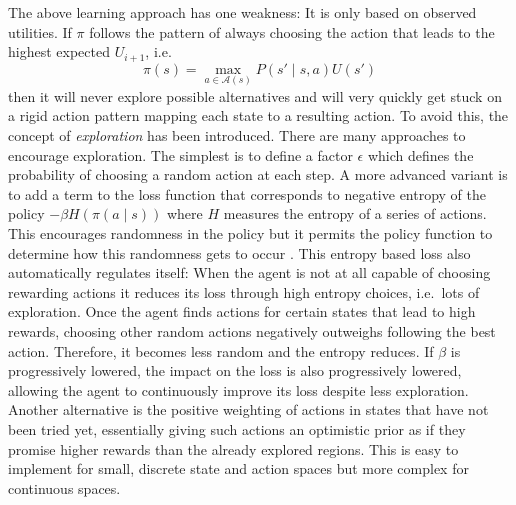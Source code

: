 The above learning approach has one weakness: It is only based on observed utilities. If $\pi$ follows the pattern of
always choosing the action that leads to the highest expected $U_{i+1}$, i.e.\
\begin{equation}
    \pi(s) = \max_{a \in \mathcal{A}(s)}P(s' \mid s, a)U(s')
\end{equation}
then it will never explore possible alternatives and will very quickly get stuck on a rigid action
pattern mapping each state to a resulting action. To avoid this, the concept of \emph{exploration} has been introduced.
There are many approaches to encourage exploration. The simplest is to define a factor $\epsilon$ which defines the
probability of choosing a random action at each step.
A more advanced variant is to add a term to the loss function that
corresponds to negative entropy of the policy $-\beta H(\pi(a \mid s ))$ where $H$ measures the entropy of a series of
actions. This encourages randomness in the policy but it permits the policy function to determine how this randomness
gets to occur \citep{schmitt2018kickstarting}. This entropy based loss also automatically regulates itself: When the
agent is not at all capable of choosing rewarding actions it reduces its loss through high entropy choices, i.e.\ lots of
exploration. Once the agent finds actions for certain states that lead to high rewards, choosing other random actions
negatively outweighs following the best action. Therefore, it becomes less random and the entropy reduces. If $\beta$ is
progressively lowered, the impact on the loss is also progressively lowered, allowing the agent to continuously improve
its loss despite less exploration.
Another alternative is the positive weighting of actions in states that have not been tried yet, essentially giving such
actions an optimistic prior as if they promise higher rewards than the already explored regions. This is easy to
implement for small, discrete state and action spaces but more complex for continuous spaces.



